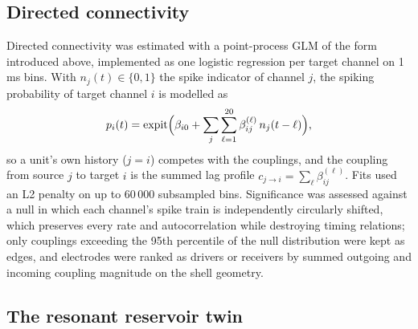 \documentclass[fullpaper]{nldl}
\begin{document}
\subsection{Directed connectivity}
\label{sec:methods-conn}

Directed connectivity was estimated with a point-process GLM of the form introduced above, implemented as one logistic regression per target channel on 1\,ms bins. With $n_j(t)\in\{0,1\}$ the spike indicator of channel $j$, the spiking probability of target channel $i$ is modelled as
\begin{equation}
  \label{eq:glm}
  p_i(t) = \operatorname{expit}\Bigl(\beta_{i0} + \sum_{j} \sum_{\ell=1}^{20} \beta_{ij}^{(\ell)}\, n_j(t-\ell)\Bigr),
\end{equation}
so a unit's own history ($j=i$) competes with the couplings, and the coupling from source $j$ to target $i$ is the summed lag profile $c_{j\to i}=\sum_{\ell}\beta_{ij}^{(\ell)}$. Fits used an L2 penalty on up to 60\,000 subsampled bins. Significance was assessed against a null in which each channel's spike train is independently circularly shifted, which preserves every rate and autocorrelation while destroying timing relations; only couplings exceeding the 95th percentile of the null distribution were kept as edges, and electrodes were ranked as drivers or receivers by summed outgoing and incoming coupling magnitude on the shell geometry.

\subsection{The resonant reservoir twin}
\label{sec:methods-twin}
\end{document}
